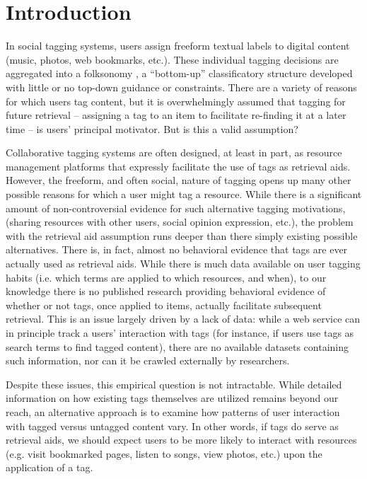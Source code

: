 \section{Introduction}
\label{sec_intro}

In social tagging systems, users assign freeform textual labels to digital content (music, photos, web bookmarks, etc.). These individual tagging decisions are aggregated into a folksonomy \cite{VanderWal2007}, a ``bottom-up'' classificatory structure developed with little or no top-down guidance or constraints. There are a variety of reasons for which users tag content, but it is overwhelmingly assumed that tagging for future retrieval -- assigning a tag to an item to facilitate re-finding it at a later time -- is users' principal motivator. But is this a valid assumption?

Collaborative tagging systems are often designed, at least in part, as resource management platforms that expressly facilitate the use of tags as retrieval aids.  However, the freeform, and often social, nature of tagging opens up many other possible reasons for which a user might tag a resource. While there is a significant amount of non-controversial evidence for such alternative tagging motivations, (sharing resources with other users, social opinion expression, etc.), the problem with the retrieval aid assumption runs deeper than there simply existing possible alternatives. There is, in fact, almost no behavioral evidence that tags are ever actually used as retrieval aids. While there is much data available on user tagging habits (i.e. which terms are applied to which resources, and when), to our knowledge there is no published research providing behavioral evidence of whether or not tags, once applied to items, actually facilitate subsequent retrieval. This is an issue largely driven by a lack of data: while a web service can in principle track a users' interaction with tags (for instance, if users use tags as search terms to find tagged content), there are no available datasets containing such information, nor can it be crawled externally by researchers.

Despite these issues, this empirical question is not intractable. While detailed information on how existing tags themselves are utilized remains beyond our reach, an alternative approach is to examine how patterns of user interaction with tagged versus untagged content vary. In other words, if tags do serve as retrieval aids, we should expect users to be more likely to interact with resources (e.g. visit bookmarked pages, listen to songs, view photos, etc.) upon the application of a tag.

